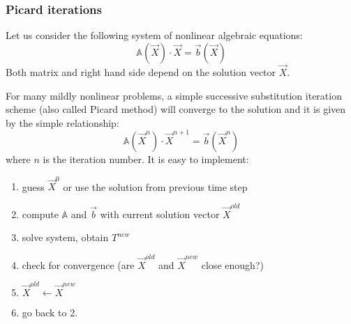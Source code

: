   


\subsubsection{Picard iterations}

Let us consider the following system of nonlinear algebraic equations:
\[
\mathbb{A}(\vec X) \cdot \vec X = \vec b(\vec X)
\]
Both matrix and right hand side depend on the solution vector $\vec X$.

For many mildly nonlinear problems, a simple successive substitution 
iteration scheme (also called Picard method) will converge to the solution
and it is given by the simple relationship:
\[
\mathbb{A}(\vec X^n) \cdot \vec X^{n+1} = \vec b(\vec X^n)
\]
where $n$ is the iteration number. 
It is easy to implement:
\begin{enumerate}
\item guess $\vec X^0$ or use the solution from previous time step
\item compute $\mathbb{A}$ and $\vec b$ with current solution vector $\vec X^{old}$
\item solve system, obtain $T^{new}$
\item check for convergence (are $\vec X^{old}$ and $\vec X^{new}$ close enough?)
\item $\vec X^{old} \leftarrow \vec X^{new}$
\item go back to 2.
\end{enumerate}

